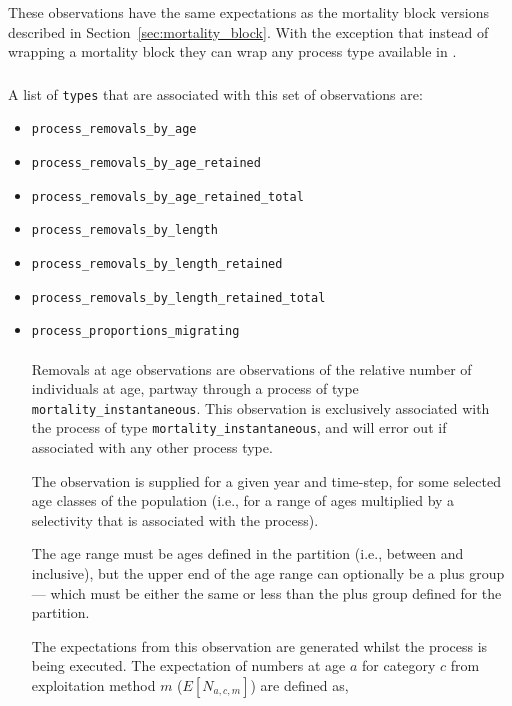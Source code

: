 These observations have the same expectations as the mortality block versions described in Section~\ref{sec:mortality_block}. With the exception that instead of wrapping a mortality block they can wrap any process type available in \CNAME.

\subsubsection{}
A list of \texttt{types} that are associated with this set of observations are:
\begin{itemize}
	\item \texttt{process\_removals\_by\_age}
	\item \texttt{process\_removals\_by\_age\_retained}
	\item \texttt{process\_removals\_by\_age\_retained\_total}
	\item \texttt{process\_removals\_by\_length}
	\item \texttt{process\_removals\_by\_length\_retained}
	\item \texttt{process\_removals\_by\_length\_retained\_total}
	\item \texttt{process\_proportions\_migrating}	
\\	
\paragraph*{\label{sec:removals-by-age}}	
Removals at age observations are observations of the relative number of individuals at age, partway through a process of type \texttt{mortality\_instantaneous}. This observation is exclusively associated with the process of type \texttt{mortality\_instantaneous}, and will error out if associated with any other process type.

The observation is supplied for a given year and time-step, for some selected age classes of the population (i.e., for a range of ages multiplied by a selectivity that is associated with the process).

The age range must be ages defined in the partition (i.e., between  and  inclusive), but the upper end of the age range can optionally be a plus group --- which must be either the same or less than the plus group defined for the partition. 

The expectations from this observation are generated whilst the process is being executed. The expectation of numbers at age $a$ for category $c$ from exploitation method $m$ ($E[N_{a,c,m}]$) are defined as,



\end{itemize}
